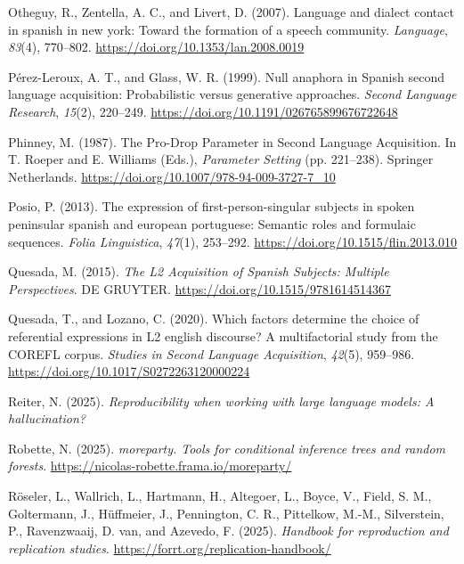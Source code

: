 \documentclass[
  letterpaper,
  DIV=11,
  numbers=noendperiod]{scrartcl}
\newlength{\cslhangindent}
\newenvironment{CSLReferences}[2] %
 {\begin{list}{}{%
  \setlength{\itemindent}{0pt}
  \setlength{\leftmargin}{0pt}
  \setlength{\parsep}{0pt}
  \ifodd #1
   \setlength{\leftmargin}{\cslhangindent}
   \setlength{\itemindent}{-1\cslhangindent}
  \fi
  \setlength{\itemsep}{#2\baselineskip}}}
 {\end{list}}
\begin{document}
\begin{CSLReferences}{1}{0}
Otheguy, R., Zentella, A. C., and Livert, D. (2007). Language and
dialect contact in spanish in new york: Toward the formation of a speech
community. \emph{Language}, \emph{83}(4), 770--802.
\url{https://doi.org/10.1353/lan.2008.0019}

Pérez-Leroux, A. T., and Glass, W. R. (1999). Null anaphora in {Spanish}
second language acquisition: Probabilistic versus generative approaches.
\emph{Second Language Research}, \emph{15}(2), 220--249.
\url{https://doi.org/10.1191/026765899676722648}

Phinney, M. (1987). The {Pro}-{Drop} {Parameter} in {Second} {Language}
{Acquisition}. In T. Roeper and E. Williams (Eds.), \emph{Parameter
{Setting}} (pp. 221--238). Springer Netherlands.
\url{https://doi.org/10.1007/978-94-009-3727-7_10}

Posio, P. (2013). The expression of first-person-singular subjects in
spoken peninsular spanish and european portuguese: Semantic roles and
formulaic sequences. \emph{Folia Linguistica}, \emph{47}(1), 253--292.
\url{https://doi.org/10.1515/flin.2013.010}

Quesada, M. (2015). \emph{The {L2} {Acquisition} of {Spanish}
{Subjects}: {Multiple} {Perspectives}}. DE GRUYTER.
\url{https://doi.org/10.1515/9781614514367}

Quesada, T., and Lozano, C. (2020). Which factors determine the choice
of referential expressions in L2 english discourse? A multifactorial
study from the COREFL corpus. \emph{Studies in Second Language
Acquisition}, \emph{42}(5), 959--986.
\url{https://doi.org/10.1017/S0272263120000224}

Reiter, N. (2025). \emph{Reproducibility when working with large
language models: A hallucination?}

Robette, N. (2025). \emph{moreparty. Tools for conditional inference
trees and random forests}.
\url{https://nicolas-robette.frama.io/moreparty/}

Röseler, L., Wallrich, L., Hartmann, H., Altegoer, L., Boyce, V., Field,
S. M., Goltermann, J., Hüffmeier, J., Pennington, C. R., Pittelkow,
M.-M., Silverstein, P., Ravenzwaaij, D. van, and Azevedo, F. (2025).
\emph{Handbook for reproduction and replication studies}.
\url{https://forrt.org/replication-handbook/}


\end{CSLReferences}
\end{document}
